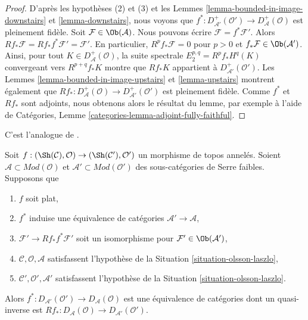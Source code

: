 \begin{proof}
D'après les hypothèses (2) et (3) et les Lemmes
\ref{lemma-bounded-in-image-downstairs} et \ref{lemma-downstairs}, nous
voyons que
$f^* : D_{\mathcal{A}'}^+(\mathcal{O}') \to D_\mathcal{A}^+(\mathcal{O})$
est pleinement fidèle. Soit $\mathcal{F} \in \Ob(\mathcal{A})$. Nous
pouvons écrire $\mathcal{F} = f^*\mathcal{F}'$. Alors
$Rf_*\mathcal{F} = Rf_* f^*\mathcal{F}' = \mathcal{F}'$.
En particulier, $R^pf_*\mathcal{F} = 0$ pour $p > 0$ et
$f_*\mathcal{F} \in \Ob(\mathcal{A}')$. Ainsi, pour tout
$K \in D^+_\mathcal{A}(\mathcal{O})$, la suite spectrale
$E_2^{p, q} = R^pf_*H^q(K)$ convergeant vers $R^{p + q}f_*K$ montre que
$Rf_*K$ appartient à $D^+_{\mathcal{A}'}(\mathcal{O}')$. Les Lemmes
\ref{lemma-bounded-in-image-upstairs} et \ref{lemma-upstairs} montrent
également que
$Rf_* : D_\mathcal{A}^+(\mathcal{O}) \to D_{\mathcal{A}'}^+(\mathcal{O}')$
est pleinement fidèle. Comme $f^*$ et $Rf_*$ sont adjoints, nous obtenons
alors le résultat du lemme, par exemple à l'aide de Catégories, Lemme
\ref{categories-lemma-adjoint-fully-faithful}.
\end{proof}

\begin{lemma}
\label{lemma-equivalence-unbounded-one}
\begin{reference}
C'est l'analogue de \cite[Theorem 2.2.3]{six-I}.
\end{reference}
Soit $f : (\Sh(\mathcal{C}), \mathcal{O}) \to (\Sh(\mathcal{C}'), \mathcal{O}')$
un morphisme de topos annelés. Soient
$\mathcal{A} \subset \textit{Mod}(\mathcal{O})$ et
$\mathcal{A}' \subset \textit{Mod}(\mathcal{O}')$ des sous-catégories de
Serre faibles. Supposons que
\begin{enumerate}
\item $f$ soit plat,
\item $f^*$ induise une équivalence de catégories
$\mathcal{A}' \to \mathcal{A}$,
\item $\mathcal{F}' \to Rf_*f^*\mathcal{F}'$ soit un isomorphisme pour
$\mathcal{F}' \in \Ob(\mathcal{A}')$,
\item $\mathcal{C}, \mathcal{O}, \mathcal{A}$ satisfassent l'hypothèse de
la Situation \ref{situation-olsson-laszlo},
\item $\mathcal{C}', \mathcal{O}', \mathcal{A}'$ satisfassent l'hypothèse
de la Situation \ref{situation-olsson-laszlo}.
\end{enumerate}
Alors $f^* : D_{\mathcal{A}'}(\mathcal{O}') \to D_\mathcal{A}(\mathcal{O})$
est une équivalence de catégories dont un quasi-inverse est
$Rf_* : D_\mathcal{A}(\mathcal{O}) \to D_{\mathcal{A}'}(\mathcal{O}')$.
\end{lemma}

